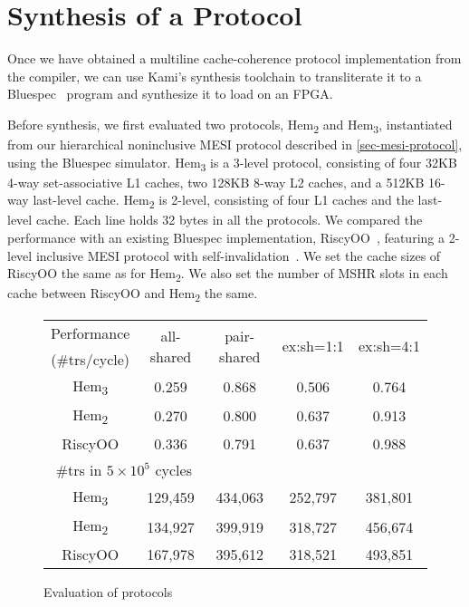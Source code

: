 \section{Synthesis of a \hemiola{} Protocol}
\label{sec-synthesis}

\newcommand{\bhemh}{{\sf Hem\textsubscript{3}}}
\newcommand{\bhemt}{{\sf Hem\textsubscript{2}}}
\newcommand{\briscy}{{\sf RiscyOO}}

Once we have obtained a multiline cache-coherence protocol implementation from the compiler, we can use Kami's synthesis toolchain to transliterate it to a Bluespec~\cite{bluespec} program and synthesize it to load on an FPGA.

Before synthesis, we first evaluated two \hemiola{} protocols, \bhemt{} and \bhemh{}, instantiated from our hierarchical noninclusive MESI protocol described in \autoref{sec-mesi-protocol}, using the Bluespec simulator.
\bhemh{} is a 3-level protocol, consisting of four 32KB 4-way set-associative L1 caches, two 128KB 8-way L2 caches, and a 512KB 16-way last-level cache.
\bhemt{} is 2-level, consisting of four L1 caches and the last-level cache.
Each line holds 32 bytes in all the protocols.
We compared the performance with an existing Bluespec implementation, \briscy{}~\cite{Zhang:2019,thesis:Zhang:2019}, featuring a 2-level inclusive MESI protocol with self-invalidation~\cite{Ros:2012}.
We set the cache sizes of \briscy{} the same as for \bhemt{}.
We also set the number of MSHR slots in each cache between \briscy{} and \bhemt{} the same.

\begin{figure}[t]
  \centering
  \begin{tabular}{c|cccc}
    \hline
    Performance & \multirow{2}{*}{all-shared} & \multirow{2}{*}{pair-shared} & \multirow{2}{*}{ex:sh=1:1} & \multirow{2}{*}{ex:sh=4:1} \\
    (\#trs/cycle) & & & & \\
    \hline
    \bhemh{} & 0.259 & 0.868 & 0.506 & 0.764 \\
    \bhemt{} & 0.270 & 0.800 & 0.637 & 0.913 \\
    \briscy{} & 0.336 & 0.791 & 0.637 & 0.988 \\
    \hline
    \multicolumn{2}{c}{\#trs in $5 \times 10^5$ cycles} & & & \\
    \hline
    \bhemh{} & 129,459 & 434,063 & 252,797 & 381,801 \\
    \bhemt{} & 134,927 & 399,919 & 318,727 & 456,674 \\
    \briscy{} & 167,978 & 395,612 & 318,521 & 493,851 \\
    \hline
  \end{tabular}
  \caption{Evaluation of \hemiola{} protocols}
  \label{fig-evaluation}
\end{figure}


